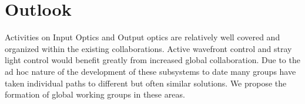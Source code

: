 \section{Outlook}
Activities on Input Optics and Output optics are relatively  well covered and organized within the existing collaborations. 
Active wavefront control and stray light control would benefit greatly from increased global collaboration. 
Due to the ad hoc nature of the development of these subsystems to date many groups have taken individual paths to different but often similar solutions. We propose the formation of global working groups in these areas. 






